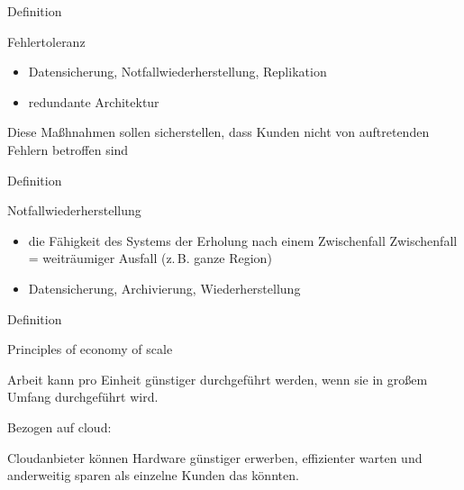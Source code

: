 \documentclass{scrartcl}
\newenvironment{flashcard}[2][]{%
    #1
    \vfill
    \centerline{\Large{#2}}
    \vfill
    \newpage
}
{\newpage}
\begin{document}
    \begin{flashcard}[Definition]{Fehlertoleranz}
        
        \begin{itemize}
            \item Datensicherung, Notfallwiederherstellung, Replikation
            \item redundante Architektur
        \end{itemize}
        Diese Maßhnahmen sollen sicherstellen, dass Kunden nicht von auftretenden Fehlern betroffen sind
    \end{flashcard}

    \begin{flashcard}[Definition]{Notfallwiederherstellung}
        \begin{itemize}
            \item die Fähigkeit des Systems der Erholung nach einem Zwischenfall\newline
            Zwischenfall = weiträumiger Ausfall (z.\,B. ganze Region)
            \item Datensicherung, Archivierung, Wiederherstellung
        \end{itemize}

    \end{flashcard}


    \begin{flashcard}[Definition]{Principles of economy of scale}
        Arbeit kann pro Einheit günstiger durchgeführt werden, wenn sie in großem Umfang durchgeführt wird.
        
        \vspace{5mm}
        Bezogen auf cloud:
        
        Cloudanbieter können Hardware günstiger erwerben, effizienter warten und anderweitig sparen als einzelne Kunden das könnten.
    \end{flashcard}
\end{document}
